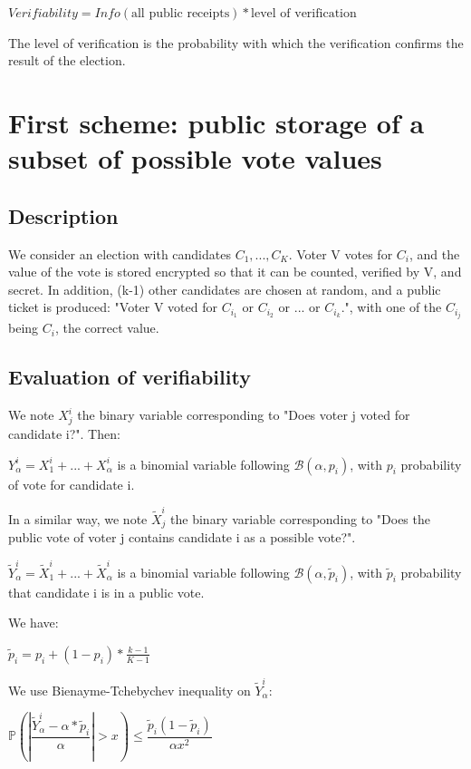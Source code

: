 \documentclass{article}
\begin{document}
$Verifiability=Info(\text{all public receipts})*\text{level of verification}$

The level of verification is the probability with which the verification confirms the result of the election.


\section{First scheme: public storage of a subset of possible vote values}

\subsection{Description}

We consider an election with candidates $C_1, ..., C_K$. Voter V votes for $C_i$, and the value of the vote is stored encrypted so that it can be counted, verified by V, and secret. In addition, (k-1) other candidates are chosen at random, and a public ticket is produced: "Voter V voted for $C_{i_1}$ or $C_{i_2}$ or ... or $C_{i_k}$.", with one of the $C_{i_j}$ being $C_i$, the correct value.

\subsection{Evaluation of verifiability}

We note $X^i_j$ the binary variable corresponding to "Does voter j voted for candidate i?". Then:

$Y_\alpha^i=X^i_1+...+X^i_\alpha$ is a binomial variable following $\mathcal{B}(\alpha, p_i)$, with $p_i$ probability of vote for candidate i.

In a similar way, we note $\tilde{X}^i_j$ the binary variable corresponding to "Does the public vote of voter j contains candidate i as a possible vote?".

$\tilde{Y}_\alpha^i=\tilde{X}^i_1+...+\tilde{X}^i_\alpha$ is a binomial variable following $\mathcal{B}(\alpha, \tilde{p}_i)$, with $\tilde{p}_i$ probability that candidate i is in a public vote.

We have:

$\tilde{p}_i=p_i+(1-p_i)*\frac{k-1}{K-1}$


We use Bienayme-Tchebychev inequality on $\tilde{Y}_\alpha^i$:

$ \mathbb{P}(|\dfrac{\tilde{Y}^i_\alpha-\alpha*\tilde{p}_i}{\alpha}| > x )  \leqslant \dfrac{\tilde{p}_i(1-\tilde{p}_i)}{\alpha x^2}$
\end{document}
